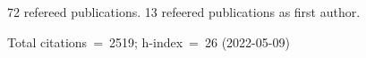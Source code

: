72 refereed publications. 13 refeered publications as first author.

Total citations~=~2519; h-index~=~26 (2022-05-09)